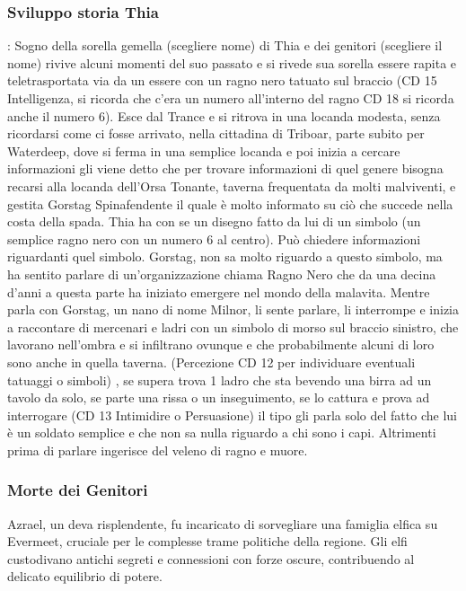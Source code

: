\documentclass{article}
\begin{document}
              \subsubsection{Sviluppo storia Thia}: Sogno della sorella gemella (scegliere nome) di Thia e dei genitori (scegliere il nome) rivive alcuni momenti del suo passato e si rivede sua sorella essere rapita e teletrasportata via da un essere con un ragno nero tatuato sul braccio (CD 15 Intelligenza, si ricorda che c'era un numero all'interno del ragno CD 18 si ricorda anche il numero 6). Esce dal Trance e si ritrova in una locanda modesta, senza ricordarsi come ci fosse arrivato, nella cittadina di  Triboar, parte subito per Waterdeep, dove si ferma in una semplice locanda e poi inizia a cercare informazioni gli viene detto che per trovare informazioni di quel genere bisogna recarsi alla locanda dell'Orsa Tonante, taverna frequentata da molti malviventi, e gestita Gorstag Spinafendente
 il quale è molto informato su ciò che succede nella costa della spada. Thia ha con se un disegno fatto da lui di un simbolo (un semplice ragno nero con un numero 6 al centro). Può chiedere informazioni riguardanti quel simbolo. Gorstag, non sa molto riguardo a questo simbolo, ma ha sentito parlare di un'organizzazione chiama Ragno Nero che da una decina d'anni a questa parte ha iniziato emergere nel mondo della malavita. 
 Mentre parla con Gorstag, un nano di nome Milnor, li sente parlare, li interrompe e inizia a raccontare di mercenari e ladri con un simbolo di morso sul braccio sinistro, che lavorano nell'ombra e si infiltrano ovunque e che probabilmente alcuni di loro sono anche in quella taverna. (Percezione CD 12 per individuare eventuali tatuaggi o simboli) , se supera trova 1 ladro che sta bevendo una birra ad un tavolo da solo, se parte una rissa o un inseguimento, se lo cattura e prova ad interrogare (CD 13 Intimidire o Persuasione) il tipo gli parla solo del fatto che lui è un soldato semplice e che non sa nulla riguardo a chi sono i capi. Altrimenti prima di parlare ingerisce del veleno di ragno e muore. 
              \subsubsection{Morte dei Genitori}Azrael, un deva risplendente, fu incaricato di sorvegliare una famiglia elfica su Evermeet, cruciale per le complesse trame politiche della regione. Gli elfi custodivano antichi segreti e connessioni con forze oscure, contribuendo al delicato equilibrio di potere.
\end{document}
